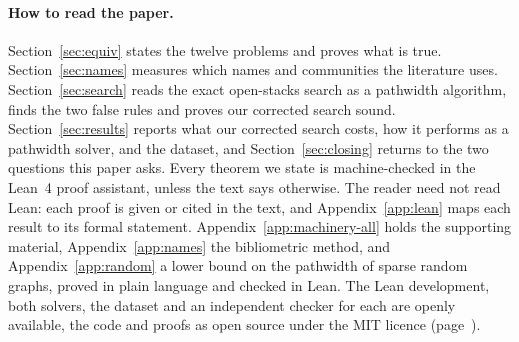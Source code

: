 \paragraph{How to read the paper.} Section~\ref{sec:equiv} states the twelve
problems and proves what is true. Section~\ref{sec:names} measures which names
and communities the literature uses. Section~\ref{sec:search} reads the exact
open-stacks search as a pathwidth algorithm, finds the two false rules and
proves our corrected search sound. Section~\ref{sec:results} reports what our
corrected search costs, how it performs as a pathwidth solver, and the dataset, and Section~\ref{sec:closing} returns to the two questions this paper asks.
Every theorem we state is machine-checked in the Lean~4 proof assistant, unless
the text says otherwise. The
reader need not read Lean: each proof is given or cited in the text, and
Appendix~\ref{app:lean} maps each result to its formal statement.
Appendix~\ref{app:machinery-all} holds the supporting material,
Appendix~\ref{app:names} the bibliometric method, and
Appendix~\ref{app:random} a lower bound on the pathwidth of sparse random
graphs, proved in plain language and checked in Lean. The Lean development,
both solvers, the dataset and an independent checker for each are openly
available, the code and proofs as open source under the MIT licence
(page~\pageref{sec:data}).
